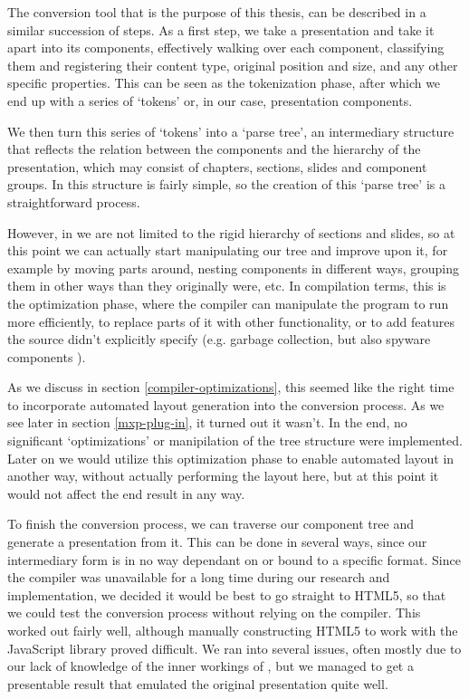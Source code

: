    The conversion tool that is the purpose of this thesis, can be described in
   a similar succession of steps. As a first step, we take a \ppt presentation
   and take it apart into its components, effectively walking over each
   component, classifying them and registering their content type, original
   position and size, and any other specific properties. This can be seen as
   the tokenization phase, after which we end up with a series of `tokens' or,
   in our case, presentation components.
  
   We then turn this series of `tokens' into a `parse tree', an intermediary
   structure that reflects the relation between the components and the
   hierarchy of the presentation, which may consist of chapters, sections,
   slides and component groups. In \ppt this structure is fairly simple, so the
   creation of this `parse tree' is a straightforward process.
  
   However, in \mxp we are not limited to the rigid hierarchy of sections and
   slides, so at this point we can actually start manipulating our tree and
   improve upon it, for example by moving parts around, nesting components in
   different ways, grouping them in other ways than they originally were, etc.
   In compilation terms, this is the optimization phase, where the compiler can
   manipulate the program to run more efficiently, to replace parts of it with
   other functionality, or to add features the source didn't explicitly specify
   (e.g. garbage collection, but also spyware components \citep{scahill-1}). 

   As we discuss in section \ref{compiler-optimizations}, this seemed like the
   right time to incorporate automated layout generation into the conversion
   process. As we see later in section \ref{mxp-plug-in}, it turned out it
   wasn't. In the end, no significant `optimizations' or manipilation of the
   tree structure were implemented. Later on we would utilize this optimization
   phase to enable automated layout in another way, without actually performing
   the layout here, but at this point it would not affect the end result in any
   way.
  
   To finish the conversion process, we can traverse our component tree and
   generate a \mxp presentation from it. This can be done in several ways,
   since our intermediary form is in no way dependant on or bound to a specific
   format. Since the \mxp compiler was unavailable for a long time during our
   research and implementation, we decided it would be best to go straight to
   HTML5, so that we could test the conversion process without relying on the
   \mxp compiler. This worked out fairly well, although manually constructing
   HTML5 to work with the \mxp JavaScript library proved difficult. We ran into
   several issues, often mostly due to our lack of knowledge of the inner
   workings of \mxp, but we managed to get a presentable result that emulated
   the original \ppt presentation quite well.


